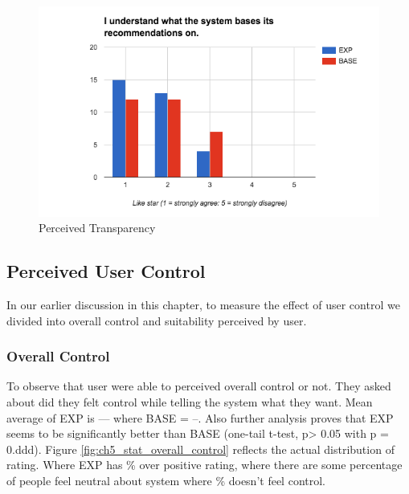 \begin{figure}[h]
	\centering
	\includegraphics[width=1\linewidth]{figures/ch5_stat_transpancy.png}
	\caption{Perceived Transparency}
	\label{fig:ch5_stat_transpancy}
\end{figure}

\subsection{Perceived User Control}

In our earlier discussion in this chapter, to measure the effect of user control we divided into overall control and suitability perceived by user. 

\subsubsection{Overall Control}

To observe that user were able to perceived overall control or not. They asked about did they felt control while telling the system what they want.  Mean average of EXP is --- where BASE = --. Also further analysis proves that EXP seems to be significantly better than BASE (one-tail t-test, p> 0.05 with p = 0.ddd). Figure \ref{fig:ch5_stat_overall_control} reflects the actual distribution of rating. Where EXP has \% over positive rating, where there are some percentage of people feel neutral about system where \% doesn’t feel control. 


